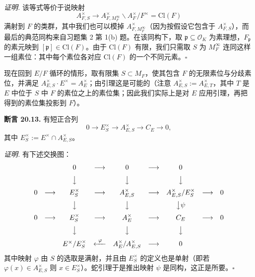 \textit{证明.} 该等式等价于说映射
\[
A_{F,S}^\times\to A_{F,M_F^\infty}^\times\backslash A_F^\times/F^\times=\mathrm{Cl}(F)
\]
满射到 $F$ 的类群，其中我们也可以模掉 $A_{F,M_F^\infty}^\times$（因为按假设它包含于 $A_{F,S}^\times$），而最后的典范同构来自习题集 2 第 1(b) 题。在该同构下，取 $\mathfrak p\subseteq\mathcal O_K$ 为素理想，$F_{\mathfrak p}$ 的素元映到 $[\mathfrak p]\in\mathrm{Cl}(F)$。由于 $\mathrm{Cl}(F)$ 有限，我们只需取 $S$ 为 $M_F^\infty$ 连同这样一组素位：其中每个素位各对应 $\mathrm{Cl}(F)$ 的一个不同元素。\hfill$\square$

现在回到 $E/F$ 循环的情形，取有限集 $S\subset M_F$，使其包含 $F$ 的无限素位与分歧素位，并满足 $A_{E,S}^\times\cdot E^\times=A_E^\times$；由引理这是可能的（注意 $A_{E,S}^\times:=A_{E,T}^\times$，其中 $T$ 是 $E$ 中位于 $S$ 中 $F$ 的素位之上的素位集；因此我们实际上是对 $E$ 应用引理，再把得到的素位集投影到 $F$）。

\textbf{断言 20.13.} 有短正合列
\[
0\to E_S^\times\to A_{E,S}^\times\to C_E\to 0,
\]
其中 $E_S^\times:=E^\times\cap A_{E,S}^\times$。

\textit{证明.} 有下述交换图：
\[
\begin{array}{ccccccccc}
 & & 0 & \longrightarrow & 0 & \longrightarrow & 0 & & \\[6pt]
 & & \big\downarrow & & \big\downarrow & & \big\downarrow & & \\[6pt]
0 & \longrightarrow & E_S^\times & \longrightarrow & A_{E,S}^\times & \longrightarrow & A_{E,S}^\times/E_S^\times & \longrightarrow & 0\\[6pt]
 & & \big\downarrow & & \big\downarrow & & \big\downarrow\psi & & \\[6pt]
0 & \longrightarrow & E_S^\times & \longrightarrow & A_E^\times & \longrightarrow & C_E & \longrightarrow & 0\\[6pt]
 & & \big\downarrow & & \big\downarrow & & \big\downarrow & & \\[6pt]
 & & E^\times/E_S^\times & \xleftarrow{\ \varphi\ } & A_E^\times/A_{E,S}^\times & \longrightarrow & 0 & &
\end{array}
\]
其中映射 $\varphi$ 由 $S$ 的选取是满射，并且由 $E_S^\times$ 的定义也是单射（即若 $\varphi(x)\in A_{E,S}^\times$ 则 $x\in E_S^\times$）。蛇引理于是推出映射 $\psi$ 是同构，这正是所要。\hfill$\square$

